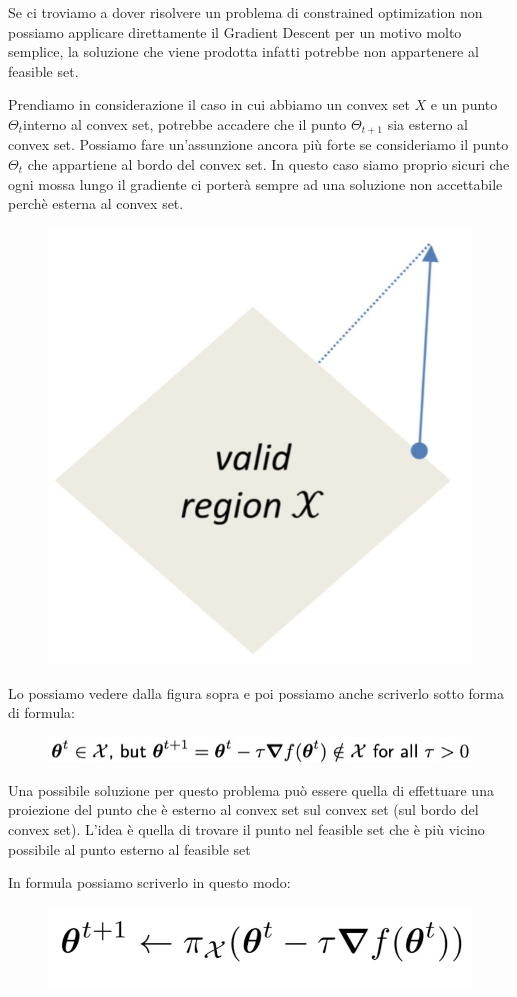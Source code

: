 \documentclass[14pt]{extreport}
\begin{document}
Se ci troviamo a dover risolvere un problema di constrained optimization non possiamo applicare direttamente il Gradient Descent per un motivo molto
semplice, la soluzione che viene prodotta infatti potrebbe non appartenere al feasible set.

Prendiamo in considerazione il caso in cui abbiamo un convex set $X$ e un punto $\Theta_t$interno al convex set, potrebbe accadere che il punto
$\Theta_{t+1}$ sia esterno al convex set. Possiamo fare un'assunzione ancora più forte se consideriamo il punto $\Theta_t$ che appartiene al bordo del
convex set. In questo caso siamo proprio sicuri che ogni mossa lungo il gradiente ci porterà sempre ad una soluzione non accettabile perchè esterna al
convex set.

\begin{figure}[H]
	\centering
	\includegraphics[width=0.4\linewidth]{282.jpeg}
\end{figure}

Lo possiamo vedere dalla figura sopra e poi possiamo anche scriverlo sotto forma di formula:

\begin{figure}[H]
	\centering
	\includegraphics[width=0.7\linewidth]{283.jpeg}
\end{figure}

Una possibile soluzione per questo problema può essere quella di effettuare una proiezione del punto che è esterno al convex set sul convex set (sul
bordo del convex set). L'idea è quella di trovare il punto nel feasible set che è più vicino possibile al punto esterno al feasible set

In formula possiamo scriverlo in questo modo:

\begin{figure}[H]
	\centering
	\includegraphics[width=0.5\linewidth]{284.jpeg}
\end{figure}
\end{document}
